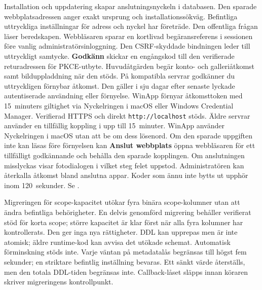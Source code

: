 \documentclass[11pt,a4paper]{article}
\newcommand{\filepath}[1]{\path{#1}}
\newcommand{\ui}[1]{\textbf{#1}}
\begin{document}
Installation och uppdatering skapar anslutningsnyckeln i databasen.
Den sparade webbplatsadressen anger exakt ursprung och installationssökväg.
Befintliga uttryckliga inställningar för adress och nyckel har företräde.
Den offentliga frågan läser beredskapen. Webbläsaren sparar en kortlivad
begäransreferens i sessionen före vanlig administratörsinloggning.
Den CSRF-skyddade bindningen leder till uttryckligt samtycke.
\ui{Godkänn} skickar en engångskod till den verifierade returadressen för
PKCE-utbyte. Huvudåtgärden begär konto- och galleriåtkomst samt bilduppladdning när den
stöds. På kompatibla servrar godkänner du uttryckligen förnybar åtkomst.
Den gäller i sju dagar efter senaste lyckade autentiserade användning eller
förnyelse. WinApp förnyar åtkomsttoken med 15~minuters giltighet via
Nyckelringen i macOS eller Windows Credential Manager. Verifierad HTTPS
och direkt \texttt{http://localhost} stöds. Äldre servrar använder en
tillfällig koppling i upp till 15~minuter.
WinApp använder Nyckelringen i macOS utan att be om dess lösenord. Om den
sparade uppgiften inte kan läsas före förnyelsen kan \ui{Anslut webbplats}
öppna webbläsaren för ett tillfälligt godkännande och behålla den sparade
kopplingen.
Om anslutningen misslyckas visar fotodialogen i vilket steg felet uppstod.
Administratören kan återkalla
åtkomst bland anslutna appar. Koder som ännu inte bytts ut upphör inom
120~sekunder. Se \filepath{docs/APP_LINKING_PHASE_0.md}.

Migreringen för scope-kapacitet utökar fyra binära scope-kolumner utan att
ändra befintliga behörigheter. En delvis genomförd migrering behåller verifierat
stöd för korta scope; större kapacitet är klar först när alla fyra kolumner har
kontrollerats. Den ger inga nya rättigheter. DDL kan upprepas men är inte
atomisk; äldre runtime-kod kan avvisa det utökade schemat. Automatisk
förminskning stöds inte.
Varje väntan på metadatalås begränsas till högst fem sekunder; en striktare
befintlig inställning bevaras. Ett sänkt värde återställs, men den totala
DDL-tiden begränsas inte.
Callback-låset släpps innan köraren skriver migreringens kontrollpunkt.
\end{document}
